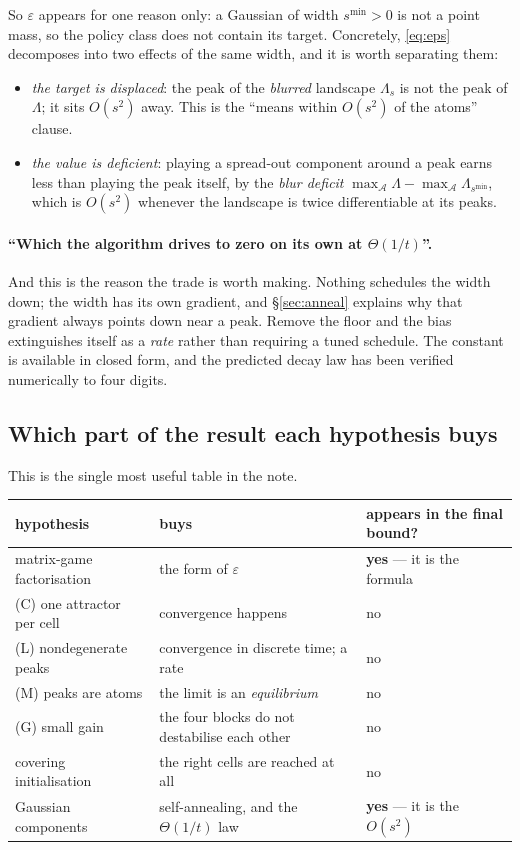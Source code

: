 \documentclass[11pt]{article}
\theoremstyle{definition}
\newcommand{\cA}{\mathcal{A}}
\begin{document}
\noindent
So $\varepsilon$ appears for one reason only: a Gaussian of width $s^{\min} > 0$
is not a point mass, so the policy class does not contain its target. Concretely,
\eqref{eq:eps} decomposes into two effects of the same width, and it is worth
separating them:
\begin{itemize}[leftmargin=1.4em, itemsep=2pt]
\item \emph{the target is displaced}: the peak of the \emph{blurred} landscape
  $\Lambda_s$ is not the peak of $\Lambda$; it sits $O(s^2)$ away. This is the
  ``means within $O(s^2)$ of the atoms'' clause.
\item \emph{the value is deficient}: playing a spread-out component around a peak
  earns less than playing the peak itself, by the \emph{blur deficit}
  $\max_\cA \Lambda - \max_\cA \Lambda_{s^{\min}}$, which is $O(s^2)$ whenever
  the landscape is twice differentiable at its peaks.
\end{itemize}

\paragraph{``Which the algorithm drives to zero on its own at $\Theta(1/t)$''.}
And this is the reason the trade is worth making. Nothing schedules the width
down; the width has its own gradient, and \S\ref{sec:anneal} explains why that
gradient always points down near a peak. Remove the floor and the bias
extinguishes itself as a \emph{rate} rather than requiring a tuned schedule. The
constant is available in closed form, and the predicted decay law has been
verified numerically to four digits.

\subsection*{Which part of the result each hypothesis buys}

This is the single most useful table in the note.

\begin{center}
\begin{tabular}{@{}p{}p{}p{}@{}}
\hline
hypothesis & buys & appears in the final bound? \\
\hline
matrix-game factorisation & the form of $\varepsilon$ & \textbf{yes} --- it is the formula \\
(C) one attractor per cell & convergence happens & no \\
(L) nondegenerate peaks & convergence in discrete time; a rate & no \\
(M) peaks are atoms & the limit is an \emph{equilibrium} & no \\
(G) small gain & the four blocks do not destabilise each other & no \\
covering initialisation & the right cells are reached at all & no \\
Gaussian components & self-annealing, and the $\Theta(1/t)$ law & \textbf{yes} --- it is the $O(s^2)$ \\
\hline
\end{tabular}
\end{center}
\end{document}
